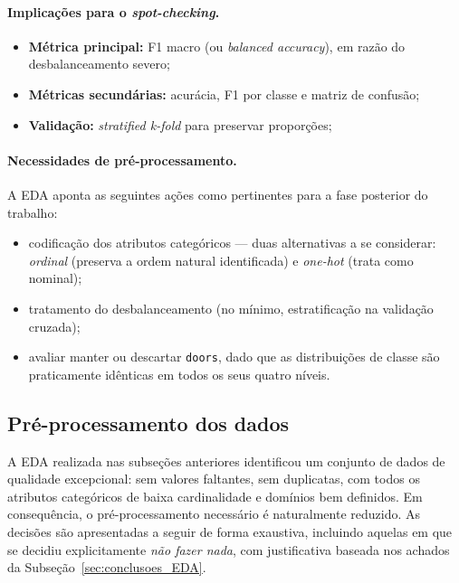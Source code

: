 \documentclass[11pt,a4paper]{article}
\newcommand{\code}[1]{\texttt{\small #1}}
\begin{document}
\paragraph{Implicações para o \textit{spot-checking}.}
\begin{itemize}
\item \textbf{Métrica principal:} F1 macro (ou \textit{balanced accuracy}), em razão do desbalanceamento severo;
\item \textbf{Métricas secundárias:} acurácia, F1 por classe e matriz de confusão;
\item \textbf{Validação:} \textit{stratified k-fold} para preservar proporções;
\end{itemize}

\paragraph{Necessidades de pré-processamento.}
A EDA aponta as seguintes ações como pertinentes para a fase posterior do trabalho:
\begin{itemize}
\item codificação dos atributos categóricos --- duas alternativas a se considerar: \emph{ordinal} (preserva a ordem natural identificada) e \emph{one-hot} (trata como nominal);
\item tratamento do desbalanceamento (no mínimo, estratificação na validação cruzada);
\item avaliar manter ou descartar \code{doors}, dado que as distribuições de classe são praticamente idênticas em todos os seus quatro níveis.
\end{itemize}

\subsection{Pré-processamento dos dados}
\label{sec:preproc}

A EDA realizada nas subseções anteriores identificou um conjunto de dados de qualidade excepcional: sem valores faltantes, sem duplicatas, com todos os atributos categóricos de baixa cardinalidade e domínios bem definidos. Em consequência, o pré-processamento necessário é naturalmente reduzido. As decisões são apresentadas a seguir de forma exaustiva, incluindo aquelas em que se decidiu explicitamente \emph{não fazer nada}, com justificativa baseada nos achados da Subseção~\ref{sec:conclusoes_EDA}.
\end{document}
